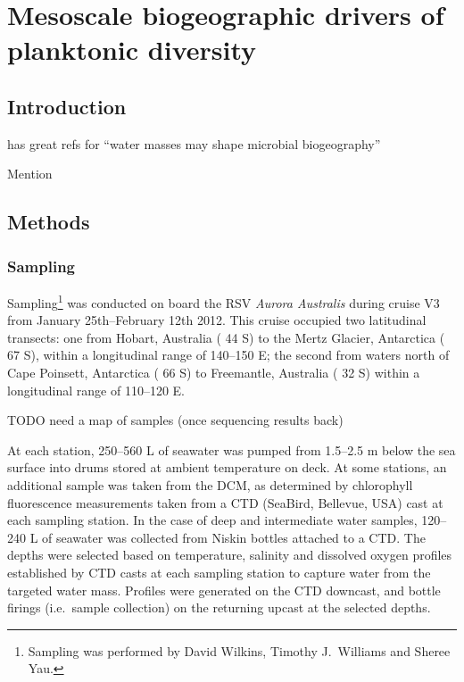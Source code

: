 \chapter{Mesoscale biogeographic drivers of planktonic diversity}
\label{ch:biogeog}

\section{Introduction}

\cite{Teira:2006th} has great refs for ``water masses may shape microbial biogeography''

Mention 

\section{Methods}

\subsection{Sampling}

Sampling\footnote{Sampling was performed by David Wilkins, Timothy J.\ Williams and Sheree Yau.} was conducted on board the RSV \textit{Aurora Australis} during cruise V3 from January 25th--February 12th 2012.
This cruise occupied two latitudinal transects: one from Hobart, Australia (\textapprox{} 44\textdegree{} S) to the Mertz Glacier, Antarctica (\textapprox{} 67\textdegree{} S), within a longitudinal range of 140--150\textdegree{} E; the second from waters north of Cape Poinsett, Antarctica (\textapprox{} 66\textdegree{} S) to Freemantle, Australia (\textapprox{} 32\textdegree{} S) within a longitudinal range of 110--120\textdegree{} E.

TODO need a map of samples (once sequencing results back)

At each station, \textapprox{} 250--560 L of seawater was pumped from \textapprox{} 1.5--2.5 m below the sea surface into drums stored at ambient temperature on deck.
At some stations, an additional sample was taken from the \ac{DCM}, as determined by chlorophyll fluorescence measurements taken from a \ac{CTD} (SeaBird, Bellevue, USA) cast at each sampling station.
In the case of deep and intermediate water samples, \textapprox{} 120--240 L of seawater was collected from Niskin bottles attached to a \ac{CTD}.
The depths were selected based on temperature, salinity and dissolved oxygen profiles established by \ac{CTD} casts at each sampling station to capture water from the targeted water mass.
Profiles were generated on the \ac{CTD} downcast, and bottle firings (i.e.\ sample collection) on the returning upcast at the selected depths.

